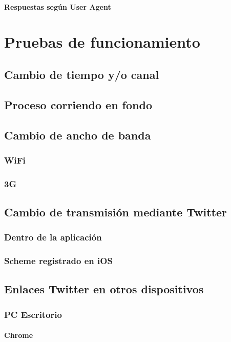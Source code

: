 		\subsubsection{Respuestas según User Agent}
		
\chapter{Pruebas de funcionamiento}
\section{Cambio de tiempo y/o canal}
\section{Proceso corriendo en fondo} %
\section{Cambio de ancho de banda}
	\subsection{WiFi}
	\subsection{3G}
\section{Cambio de transmisión mediante Twitter}
	\subsection{Dentro de la aplicación}
	\subsection{Scheme registrado en iOS}
\section{Enlaces Twitter en otros dispositivos}
	\subsection{PC Escritorio}
		\subsubsection{Chrome}
